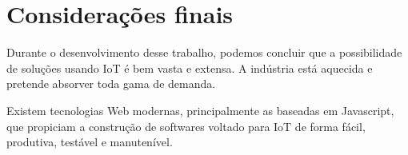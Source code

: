 \section*{Considerações finais}

Durante o desenvolvimento desse trabalho, podemos concluir que a possibilidade de soluções usando IoT é bem vasta e extensa. A indústria está aquecida e pretende absorver toda gama de demanda.

Existem tecnologias Web modernas, principalmente as baseadas em Javascript, que propiciam a construção de softwares voltado para IoT de forma fácil, produtiva, testável e manutenível.